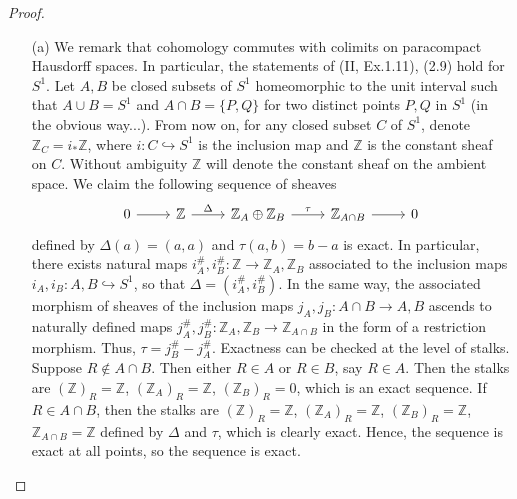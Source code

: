\documentclass{article}
\newcommand{\Z}{\mathbb{Z}}
\begin{document}
\begin{enumerate} [label=\textbf{\arabic*.}, leftmargin=0em]
\begin{proof} $ $ \vspace{0pt}
\begin{itemize} [leftmargin=0cm]
\item[(a)] We remark that cohomology commutes with colimits on paracompact Hausdorff spaces. In particular, the statements of (II, Ex.1.11), (2.9) hold for $S^1$. Let $A, B$ be closed subsets of $S^1$ homeomorphic to the unit interval such that $A \cup B = S^1$ and $A \cap B = \{ P, Q \}$ for two distinct points $P, Q$ in $S^1$ (in the obvious way...). From now on, for any closed subset $C$ of $S^1$, denote $\Z_C = i_* \Z$, where $i : C \hookrightarrow S^1$ is the inclusion map and $\Z$ is the constant sheaf on $C$. Without ambiguity $\Z$ will denote the constant sheaf on the ambient space. We claim the following sequence of sheaves
\[\begin{tikzcd}
    0 \arrow[r] & \Z \arrow[r, "\Delta"] & \Z_A \oplus \Z_B \arrow[r, "\tau"] & \Z_{A \cap B} \arrow[r] & 0
    \end{tikzcd}\]
defined by $\Delta(a) = (a, a)$ and $\tau(a, b) = b - a$ is exact. In particular, there exists natural maps $i^\#_A, i^\#_B : \Z \to \Z_A, \Z_B$ associated to the inclusion maps $i_A, i_B : A, B \hookrightarrow S^1$, so that $\Delta = (i_A^\#, i_B^\#)$. In the same way, the associated morphism of sheaves of the inclusion maps $j_A, j_B : A \cap B \to A, B$ ascends to naturally defined maps $j_A^\#, j_B^\# : \Z_A, \Z_B \to \Z_{A \cap B}$ in the form of a restriction morphism. Thus, $\tau = j_B^\# - j_A^\#$. Exactness can be checked at the level of stalks. Suppose $R \notin A \cap B$. Then either $R \in A$ or $R \in B$, say $R \in A$. Then the stalks are $(\Z)_R = \Z$, $(\Z_A)_R = \Z$, $(\Z_B)_R = 0$, which is an exact sequence. If $R \in A \cap B$, then the stalks are $(\Z)_R = \Z$, $(\Z_A)_R = \Z$, $(\Z_B)_R = \Z$, $\Z_{A \cap B} = \Z$ defined by $\Delta$ and $\tau$, which is clearly exact. Hence, the sequence is exact at all points, so the sequence is exact.


\end{itemize}
\end{proof}
\end{enumerate}
\end{document}
